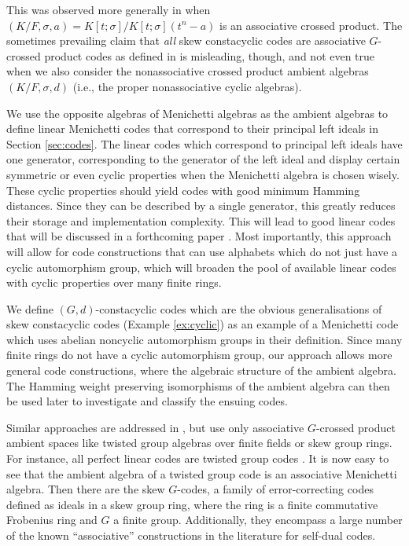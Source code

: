 \documentclass[11pt]{amsart}
\theoremstyle{plain}
\theoremstyle{definition}
\begin{document}
This was observed more generally in \cite{GM} when $(K/F,\sigma,a)=K[t;\sigma]/K[t;\sigma](t^n-a)$ is an associative crossed product. The sometimes prevailing  claim that \emph{all} skew constacyclic codes are associative $G$-crossed product codes as defined in \cite{GM} is misleading, though, and not even true when we also consider the nonassociative crossed product ambient algebras $(K/F,\sigma,d)$ (i.e., the proper nonassociative cyclic algebras).


   We use the opposite algebras of  Menichetti algebras as the ambient algebras to define linear Menichetti codes that correspond to their principal left ideals in Section \ref{sec:codes}. The linear codes which correspond to principal left ideals have one generator, corresponding to the generator  of the left ideal and display certain symmetric or even cyclic properties when the Menichetti algebra is chosen wisely. These cyclic properties should yield codes with good minimum Hamming distances. Since they can be described by a single generator, this greatly reduces their storage and implementation complexity. This will lead to good linear codes that will be discussed in a forthcoming paper \cite{Pum25.2}.
    Most importantly, this approach will allow for code constructions that can use alphabets which do not just have a cyclic automorphism group, which will broaden the pool of available linear codes with cyclic properties over many finite rings.


We  define $(G,d)$-constacyclic  codes which are the obvious generalisations of skew constacyclic codes (Example \ref{ex:cyclic}) as an example of a Menichetti code which uses abelian noncyclic automorphism groups in their definition.
Since many finite rings do not have a cyclic automorphism group, our approach allows  more general code constructions, where the algebraic structure of the ambient algebra. The Hamming weight preserving isomorphisms of the ambient algebra can then be used later to investigate and classify the ensuing codes.



  Similar approaches are addressed in  \cite{DW21, DS,  G, GM, SU25}, but use only associative $G$-crossed product ambient spaces like twisted group algebras over finite fields or skew group rings.  For instance, all perfect linear codes are twisted group codes \cite{DW21}. It is now easy to see that the ambient algebra of a twisted group code is an associative Menichetti algebra.
  Then there are the skew $G$-codes,  a family of error-correcting codes defined as ideals in a skew group ring,
   where the ring is a finite commutative Frobenius ring and $G$ a finite group.
   Additionally,
   they encompass a large number of the known ``associative'' constructions in the literature for self-dual codes.
\end{document}
